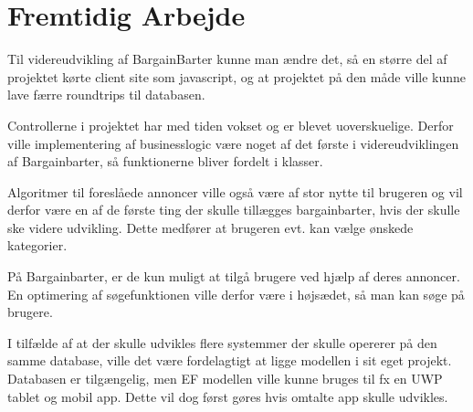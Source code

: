 \chapter{Fremtidig Arbejde}

Til videreudvikling af BargainBarter kunne man ændre det, så en større del af projektet kørte client site som javascript, og at projektet på den måde ville kunne lave færre roundtrips til databasen. 

Controllerne i projektet har med tiden vokset og er blevet uoverskuelige. Derfor ville implementering af businesslogic være noget af det første i videreudviklingen af Bargainbarter, så funktionerne bliver fordelt i klasser.

Algoritmer til foreslåede annoncer ville også være af stor nytte til brugeren og vil derfor være en af de første ting der skulle tillægges bargainbarter, hvis der skulle ske videre udvikling. Dette medfører at brugeren evt. kan vælge ønskede kategorier.

På Bargainbarter, er de kun muligt at tilgå brugere ved hjælp af deres annoncer. En optimering af søgefunktionen ville derfor være i højsædet, så man kan søge på brugere.

I tilfælde af at der skulle udvikles flere systemmer der skulle opererer på den samme database, ville det være fordelagtigt at ligge modellen i sit eget projekt. Databasen er tilgængelig, men EF modellen ville kunne bruges til fx en UWP tablet og mobil app. Dette vil dog først gøres hvis omtalte app skulle udvikles.  